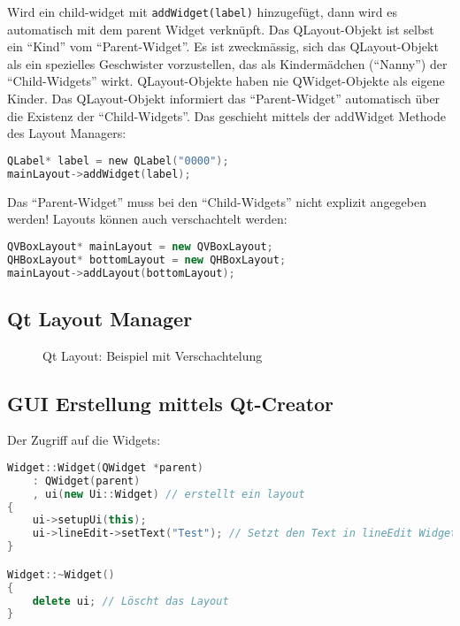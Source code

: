 Wird ein child-widget mit \lstinline{addWidget(label)} hinzugefügt, dann wird es automatisch mit dem parent Widget verknüpft.
Das QLayout-Objekt ist selbst ein ``Kind'' vom ``Parent-Widget''. Es ist zweckmässig, sich das QLayout-Objekt als ein spezielles Geschwister vorzustellen, das als Kindermädchen (``Nanny'') der ``Child-Widgets'' wirkt. QLayout-Objekte haben nie QWidget-Objekte als eigene Kinder.
Das QLayout-Objekt informiert das ``Parent-Widget'' automatisch über die Existenz der ``Child-Widgets''. Das geschieht mittels der addWidget Methode des Layout Managers:
\begin{lstlisting}[language=c++]
QLabel* label = new QLabel("0000");
mainLayout->addWidget(label);
\end{lstlisting}
Das ``Parent-Widget'' muss bei den ``Child-Widgets'' nicht explizit angegeben werden!
Layouts können auch verschachtelt werden:
\begin{lstlisting}[language=c++]
QVBoxLayout* mainLayout = new QVBoxLayout;
QHBoxLayout* bottomLayout = new QHBoxLayout;
mainLayout->addLayout(bottomLayout);
\end{lstlisting}

\subsection{Qt Layout Manager}
\begin{figure}[ht]
    \centering
    \caption{Qt Layout: Beispiel mit Verschachtelung}
\end{figure}

\subsection{GUI Erstellung mittels Qt-Creator}
Der Zugriff auf die Widgets:
\begin{lstlisting}[language=c++]
Widget::Widget(QWidget *parent)
    : QWidget(parent)
    , ui(new Ui::Widget) // erstellt ein layout
{
    ui->setupUi(this);
    ui->lineEdit‐>setText("Test"); // Setzt den Text in lineEdit Widget
}

Widget::~Widget()
{
    delete ui; // Löscht das Layout
}
\end{lstlisting}

